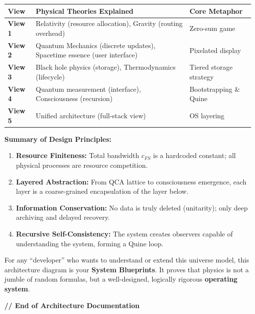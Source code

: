 \documentclass[11pt,a4paper,twoside]{book}
\begin{document}
\begin{table}[h]
\centering
\begin{tabular}{|l|l|l|}
\hline
\textbf{View} & \textbf{Physical Theories Explained} & \textbf{Core Metaphor} \\
\hline
\textbf{View 1} & Relativity (resource allocation), Gravity (routing overhead) & Zero-sum game \\
\hline
\textbf{View 2} & Quantum Mechanics (discrete updates), Spacetime essence (user interface) & Pixelated display \\
\hline
\textbf{View 3} & Black hole physics (storage), Thermodynamics (lifecycle) & Tiered storage strategy \\
\hline
\textbf{View 4} & Quantum measurement (interface), Consciousness (recursion) & Bootstrapping \& Quine \\
\hline
\textbf{View 5} & Unified architecture (full-stack view) & OS layering \\
\hline
\end{tabular}
\end{table}

\textbf{Summary of Design Principles:}

\begin{enumerate}
\item \textbf{Resource Finiteness:} Total bandwidth $c_{FS}$ is a hardcoded constant; all physical processes are resource competition.

\item \textbf{Layered Abstraction:} From QCA lattice to consciousness emergence, each layer is a coarse-grained encapsulation of the layer below.

\item \textbf{Information Conservation:} No data is truly deleted (unitarity); only deep archiving and delayed recovery.

\item \textbf{Recursive Self-Consistency:} The system creates observers capable of understanding the system, forming a Quine loop.
\end{enumerate}

For any ``developer'' who wants to understand or extend this universe model, this architecture diagram is your \textbf{System Blueprints}. It proves that physics is not a jumble of random formulas, but a well-designed, logically rigorous \textbf{operating system}.

\textbf{// End of Architecture Documentation}

\clearpage{}
\end{document}
